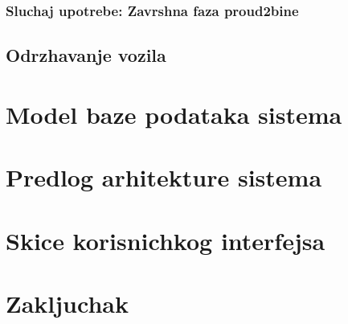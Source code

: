 \documentclass{article}
\begin{document}
\subsubsection{Sluchaj upotrebe: Zavrshna faza proud2bine}


\subsection{Odrzhavanje vozila}



\section{Model baze podataka sistema}


\section{Predlog arhitekture sistema}


\section{Skice korisnichkog interfejsa}


\section{Zakljuchak}

\newpage

\nocite{*}
\selectfont



\end{document}
